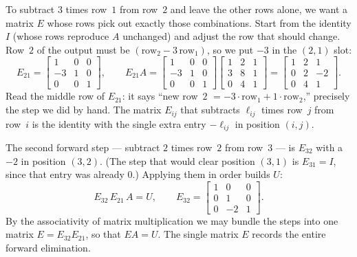 To subtract $3$ times row~$1$ from row~$2$ and leave the other rows alone, we want a matrix $E$ whose rows pick out exactly those combinations. Start from the identity $I$ (whose rows reproduce $A$ unchanged) and adjust the row that should change. Row~$2$ of the output must be $(\text{row}_2 - 3\,\text{row}_1)$, so we put $-3$ in the $(2,1)$ slot:
\[
E_{21}=\begin{bmatrix} 1 & 0 & 0\\ -3 & 1 & 0\\ 0 & 0 & 1\end{bmatrix},
\qquad
E_{21}A=\begin{bmatrix} 1 & 0 & 0\\ -3 & 1 & 0\\ 0 & 0 & 1\end{bmatrix}
\begin{bmatrix} 1 & 2 & 1\\ 3 & 8 & 1\\ 0 & 4 & 1\end{bmatrix}
=\begin{bmatrix} 1 & 2 & 1\\ 0 & 2 & -2\\ 0 & 4 & 1\end{bmatrix}.
\]
Read the middle row of $E_{21}$: it says ``new row~$2$ $= -3\cdot\text{row}_1 + 1\cdot\text{row}_2$,'' precisely the step we did by hand. The matrix $E_{ij}$ that subtracts $\ell_{ij}$ times row~$j$ from row~$i$ is the identity with the single extra entry $-\ell_{ij}$ in position $(i,j)$.

The second forward step --- subtract $2$ times row~$2$ from row~$3$ --- is $E_{32}$ with a $-2$ in position $(3,2)$. (The step that would clear position $(3,1)$ is $E_{31}=I$, since that entry was already $0$.) Applying them in order builds $U$:
\[
E_{32}\,E_{21}\,A = U,
\qquad
E_{32}=\begin{bmatrix} 1 & 0 & 0\\ 0 & 1 & 0\\ 0 & -2 & 1\end{bmatrix}.
\]
By the associativity of matrix multiplication we may bundle the steps into one matrix $E=E_{32}E_{21}$, so that $EA=U$. The single matrix $E$ records the entire forward elimination.


